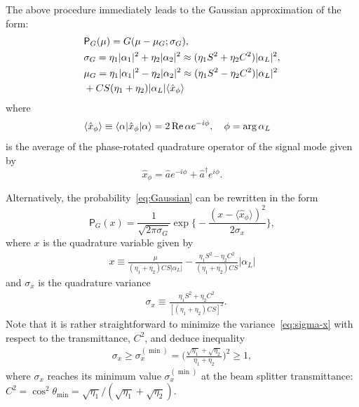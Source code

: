 \documentclass[%
reprint,
superscriptaddress,
 amsmath,amssymb,amsfonts,
 aps,
 pra,
 longbibliography
]{revtex4-2}
\newcommand{\ket}[1]{\ensuremath{|{#1}\rangle}}
\newcommand{\bra}[1]{\ensuremath{\langle{#1}|}}
\newcommand{\avr}[1]{\ensuremath{\langle{#1}\rangle}}
\renewcommand{\Re}{\mathop{\rm Re}\nolimits}
\newcommand{\prob}{\mathsf{P}}
\begin{document}
The above procedure
immediately leads to the Gaussian approximation
of the form:
\begin{align}
  &
  \label{eq:Gaussian}
    \prob_G(\mu)=G(\mu-\mu_G;\sigma_G),
    \\
  &
    \label{eq:sigma_G}
    \sigma_G=\eta_1|\alpha_1|^2+\eta_2|\alpha_2|^2
    \approx
    (\eta_1S^2+\eta_2C^2) |\alpha_L|^2,
  \\
  &
    \label{eq:mu_G}
    \mu_G=\eta_1|\alpha_1|^2-\eta_2|\alpha_2|^2
    \approx
    (\eta_1S^2-\eta_2C^2) |\alpha_L|^2
    \notag
  \\
  &
    +CS (\eta_1+\eta_2) |\alpha_L| \avr{\hat{x}_\phi}
\end{align}
where
\begin{align}
  &
  \label{eq:avr-x-phi}
  \avr{\hat{x}_\phi}\equiv \bra{\alpha}\hat{x}_\phi\ket{\alpha}={2\Re\alpha e^{-i\phi}},
  \quad \phi=\arg\alpha_L
\end{align}
is the average of
the phase-rotated quadrature operator of the signal mode
given by
\begin{equation}
\hat{x}_\phi=\hat{a}e^{-i\phi}+\hat{a}^\dag e^{i\phi}.
    \label{eq:quad-op}
\end{equation}

Alternatively, the probability~\eqref{eq:Gaussian}
can be rewritten in the form
\begin{equation}
{\prob}_G(x)=\frac{1}{\sqrt{2\pi\sigma_G}}
    \exp \biggl\{-\frac{(x-\avr{\hat{x}_\phi})^2}{2\sigma_x}\biggr\},
    \label{eq:Pgood-w-def}
\end{equation}
where
$x$ is the quadrature variable given by
\begin{align}
  \label{eq:x-def}
  x\equiv\frac{\mu}{(\eta_1+\eta_2)CS|\alpha_L|}-\frac{\eta_1S^2-\eta_2C^2}{\left(\eta_1+\eta_2\right)CS}|\alpha_L|
\end{align}
and $\sigma_x$ is the quadrature variance
\begin{align}
  &
        \label{eq:sigma-x}
    \sigma_x\equiv
    \frac{\eta_1S^2+\eta_2C^2}{
    \left[(\eta_1+\eta_2)CS\right]^2
    }.
\end{align}
Note that it is rather straightforward to minimize
the variance~\eqref{eq:sigma-x} with respect to
the transmittance, $C^2$, and
deduce inequality
\begin{align}
  \label{eq:sigma-x-min}
  \sigma_x\ge \sigma^{(\min)}_{x}=\Biggl(
\frac{\sqrt{\eta_1}+\sqrt{\eta_2}}{\eta_1+\eta_2}
  \Biggr)^2\ge 1,
\end{align}
where $\sigma_x$ reaches its minimum value
$\sigma^{(\min)}_{x}$ at the beam splitter transmittance:
$C^2=\cos^2\theta_{\min}=\sqrt{\eta_1}/(\sqrt{\eta_1}+\sqrt{\eta_2})$.
\end{document}
